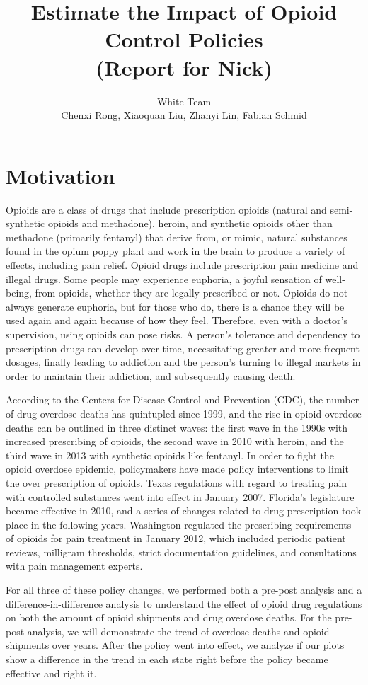 \documentclass[12pt,letterpaper]{article}
\author{White Team \\ Chenxi Rong, Xiaoquan Liu, Zhanyi Lin, Fabian Schmid}
\title{Estimate the Impact of Opioid Control Policies \\ (Report for Nick)}
\begin{document}
\maketitle

\section{Motivation}
Opioids are a class of drugs that include prescription opioids (natural and semi-synthetic opioids and methadone), heroin, and synthetic opioids other than methadone (primarily fentanyl) that derive from, or mimic, natural substances found in the opium poppy plant and work in the brain to produce a variety of effects, including pain relief. Opioid drugs include prescription pain medicine and illegal drugs. Some people may experience euphoria, a joyful sensation of well-being, from opioids, whether they are legally prescribed or not. Opioids do not always generate euphoria, but for those who do, there is a chance they will be used again and again because of how they feel. Therefore, even with a doctor's supervision, using opioids can pose risks. A person's tolerance and dependency to prescription drugs can develop over time, necessitating greater and more frequent dosages, finally leading to addiction and the person's turning to illegal markets in order to maintain their addiction, and subsequently causing death.

According to the Centers for Disease Control and Prevention (CDC), the number of drug overdose deaths has quintupled since 1999, and the rise in opioid overdose deaths can be outlined in three distinct waves: the first wave in the 1990s with increased prescribing of opioids, the second wave in 2010 with heroin, and the third wave in 2013 with synthetic opioids like fentanyl. In order to fight the opioid overdose epidemic, policymakers have made policy interventions to limit the over prescription of opioids. Texas regulations with regard to treating pain with controlled substances went into effect in January 2007. Florida’s legislature became effective in 2010, and a series of changes related to drug prescription took place in the following years. Washington regulated the prescribing requirements of opioids for pain treatment in January 2012, which included periodic patient reviews, milligram thresholds, strict documentation guidelines, and consultations with pain management experts.

For all three of these policy changes, we performed both a pre-post analysis and a difference-in-difference analysis to understand the effect of opioid drug regulations on both the amount of opioid shipments and drug overdose deaths. For the pre-post analysis, we will demonstrate the trend of overdose deaths and opioid shipments over years. After the policy went into effect, we analyze if our plots show a difference in the trend in each state right before the policy became effective and right it.
\end{document}
